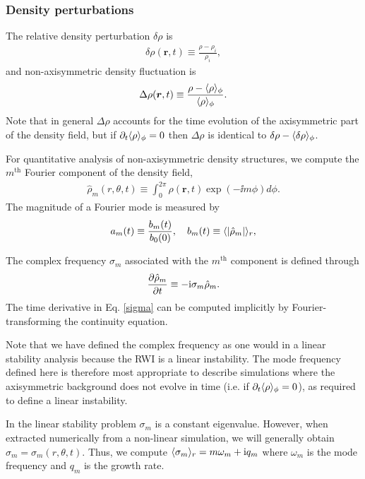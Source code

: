 \subsubsection{Density perturbations}
The relative density perturbation $\delta\rho$ is 
\begin{align}
  \delta\rho(\bm{r},t) \equiv \frac{\rho - \rho_i}{\rho_i}, 
\end{align}
and non-axisymmetric density fluctuation is 
\begin{align}
  \Delta\rho(\bm{r},t) \equiv \frac{\rho - \langle \rho \rangle_\phi}{\langle \rho \rangle_\phi}.
\end{align}
Note that in general $\Delta\rho$ accounts for the time evolution of
the axisymmetric part of the density field, but if
$\partial_t\langle \rho \rangle_\phi=0$ then $\Delta\rho$ is  identical to
$\delta\rho-\langle \delta\rho \rangle_\phi$.   

For quantitative analysis of non-axisymmetric density structures, we  
compute the $m^\mathrm{th}$ Fourier component of the density field, 
\begin{align}
\hat{\rho}_m(r,\theta,t) \equiv \int_0^{2\pi} \rho(\bm{r},t)\exp{(-\ii m\phi)}d\phi.
\end{align}
The magnitude of a Fourier mode is measured by 
\begin{align} 
a_m(t)\equiv \frac{b_m(t)}{b_0(0)},\quad b_m(t)\equiv \langle |\hat{\rho}_m| \rangle_r,
\end{align} 


The complex frequency $\sigma_m$ associated with the $m^\mathrm{th}$ component 
is defined through 
\begin{align}\label{sigma}
  \frac{\partial\hat{\rho}_m}{\partial t} \equiv -\mathrm{i}\sigma_m\hat{\rho}_m. 
\end{align}
The time derivative in Eq. \ref{sigma} can be computed implicitly by 
Fourier-transforming the continuity equation.

Note that we have defined the complex frequency as one would in a
linear stability analysis because the RWI is a linear 
instability. %
The mode frequency defined here is therefore most appropriate to
describe simulations where the axisymmetric background does not evolve
in time (i.e. if $\partial_t\langle \rho \rangle_\phi=0$), as required to define a
linear instability. 

In the linear stability problem $\sigma_m$ is a constant eigenvalue. 
However, when extracted numerically from a non-linear simulation, 
we will generally obtain $\sigma_m=\sigma_m(r,\theta,t)$. Thus, we compute 
$\langle \sigma_m \rangle_r = m\omega_m + \mathrm{i} q_m$    
where $\omega_m$ is the mode frequency and $q_m$ is the growth rate.  



